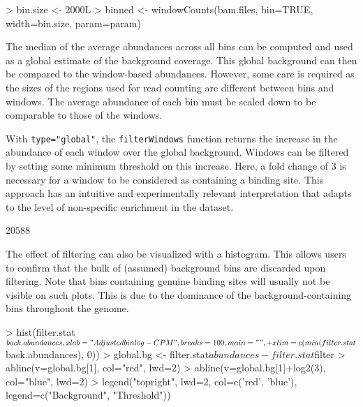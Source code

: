 \documentclass[12pt]{report}
\renewenvironment{Schunk}{\vspace{0pt}}{\vspace{0pt}}
\newcommand{\code}[1]{{\small\texttt{#1}}}
\begin{document}
\begin{Schunk}
\begin{Sinput}
> bin.size <- 2000L
> binned <- windowCounts(bam.files, bin=TRUE, width=bin.size, param=param)
\end{Sinput}
\end{Schunk}

The median of the average abundances across all bins can be computed and used as a global estimate of the background coverage.
This global background can then be compared to the window-based abundances.
However, some care is required as the sizes of the regions used for read counting are different between bins and windows.
The average abundance of each bin must be scaled down to be comparable to those of the windows.

With \code{type="global"}, the \code{filterWindows} function returns the increase in the abundance of each window over the global background.
Windows can be filtered by setting some minimum threshold on this increase.
Here, a fold change of 3 is necessary for a window to be considered as containing a binding site. 
This approach has an intuitive and experimentally relevant interpretation that adapts to the level of non-specific enrichment in the dataset. 

\begin{Schunk}
\begin{Soutput}
[1] 20588
\end{Soutput}
\end{Schunk}

The effect of filtering can also be visualized with a histogram. 
This allows users to confirm that the bulk of (assumed) background bins are discarded upon filtering. 
Note that bins containing genuine binding sites will usually not be visible on such plots.
This is due to the dominance of the background-containing bins throughout the genome.

\begin{Schunk}
\begin{Sinput}
> hist(filter.stat$back.abundances, xlab="Adjusted bin log-CPM", breaks=100, main="", 
+     xlim=c(min(filter.stat$back.abundances), 0))
> global.bg <- filter.stat$abundances - filter.stat$filter
> abline(v=global.bg[1], col="red", lwd=2)
> abline(v=global.bg[1]+log2(3), col="blue", lwd=2)
> legend("topright", lwd=2, col=c('red', 'blue'), legend=c("Background", "Threshold"))
\end{Sinput}
\end{Schunk}
\end{document}
